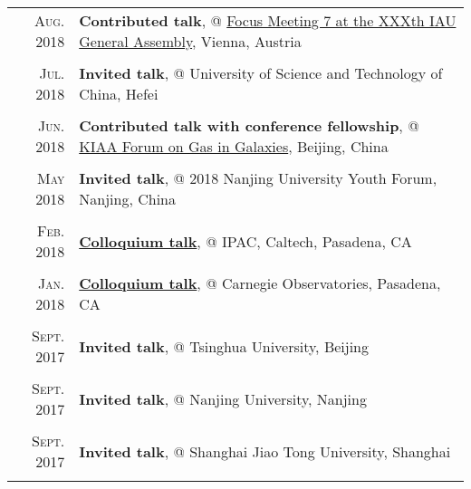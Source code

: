 \documentclass[letterpaper,11pt]{article}
\begin{document}
\begingroup
\renewcommand\arraystretch{0.3}
\begin{longtable}{r|p{5.6in}}

    \textsc{Aug. 2018}   &   \textbf{Contributed talk}, @ \href{http://www.arcetri.astro.it/fm7/programme.html}{Focus Meeting 7 at the XXXth IAU General Assembly}, Vienna, Austria \\
    \multicolumn{2}{c}{} \\

    \textsc{Jul. 2018}   &   \textbf{Invited talk}, @ University of Science and Technology of China, Hefei \\
    \multicolumn{2}{c}{} \\

    \textsc{Jun. 2018}   &   \textbf{Contributed talk with conference fellowship}, @ \href{http://kiaa.pku.edu.cn/gasingalaxies/?q=program}{KIAA Forum on Gas in Galaxies}, Beijing, China \\
    \multicolumn{2}{c}{} \\

    \textsc{May 2018}   &   \textbf{Invited talk}, @ 2018 Nanjing University Youth Forum, Nanjing, China \\
    \multicolumn{2}{c}{} \\

    \textsc{Feb. 2018}   &   \href{https://www.ipac.caltech.edu/event/358}{\textbf{Colloquium talk}}, @ IPAC, Caltech, Pasadena, CA \\
    \multicolumn{2}{c}{} \\

    \textsc{Jan. 2018}   &   \href{http://obs.carnegiescience.edu/talk_event/828}{\textbf{Colloquium talk}}, @ Carnegie Observatories, Pasadena, CA \\
    \multicolumn{2}{c}{} \\

    \textsc{Sept. 2017}   &   \textbf{Invited talk}, @ Tsinghua University, Beijing \\
    \multicolumn{2}{c}{} \\

    \textsc{Sept. 2017}   &   \textbf{Invited talk}, @ Nanjing University, Nanjing \\
    \multicolumn{2}{c}{} \\

    \textsc{Sept. 2017}   &   \textbf{Invited talk}, @ Shanghai Jiao Tong University, Shanghai \\
    \multicolumn{2}{c}{} \\


\end{longtable}
\end{document}
